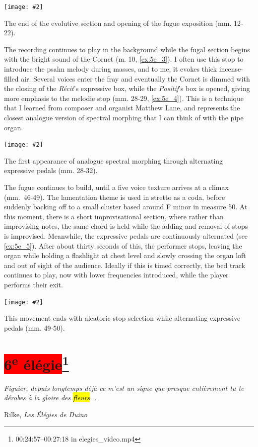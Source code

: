 \documentclass[12pt,twoside,maitrise]{dms_ks}
\newcommand{\customincludeexamples}[4][]{%
    \begin{example}[H]
        \centering
        \texttt{[image: \#2]}
        \caption{#4}
	\label{#3} 
    \end{example}
}
\theoremstyle{definition}
\begin{document}
{\customincludeexamples[width=\textwidth]{5e_3}{ex:5e_3}{The end of the evolutive section and opening of the fugue exposition (mm. 12-22).}

The recording continues to play in the background while the fugal section begins with the bright sound of the Cornet (m. 10, \cref{ex:5e_3}). 
I often use this stop to introduce the psalm melody during masses, and to me, it evokes thick incense-filled air. 
Several voices enter the fray and eventually the Cornet is dimmed with the closing of the \textit{Récit}'s expressive box, while the \textit{Positif}'s box is opened, giving more emphasis to the melodie stop (mm. 28-29, \cref{ex:5e_4}). 
This is a technique that I learned from composer and organist Matthew Lane, and represents the closest analogue version of spectral morphing that I can think of with the pipe organ. 
\customincludeexamples[width=\textwidth]{5e_4}{ex:5e_4}{The first appearance of analogue spectral morphing through alternating expressive pedals (mm. 28-32).}

The fugue continues to build, until a five voice texture arrives at a climax (mm.~46-49). The lamentation theme is used in stretto as a coda, before suddenly backing off to a small cluster based around F minor in measure 50.
At this moment, there is a short improvisational section, where rather than improvising notes, the same chord is held while the adding and removal of stops is improvised.
Meanwhile, the expressive pedals are continuously alternated (see \cref{ex:5e_5}). After about thirty seconds of this, the performer stops, leaving the organ while holding a flashlight at chest level and slowly crossing the organ loft and out of sight of the audience. Ideally if this is timed correctly, the bed track continues to play, now with lower frequencies introduced, while the player performs their exit.

\customincludeexamples[width=\textwidth]{5e_5}{ex:5e_5}{This movement ends with aleatoric stop selection while alternating expressive pedals (mm. 49-50).}

\section{\colorbox{red}{6\textsuperscript{e} élégie}\footnote{00:24:57--00:27:18 in elegies\_video.mp4}}

\epigraph{\textit{Figuier, depuis longtemps déjà ce m'est un signe que presque entièrement tu te dérobes à la gloire des \hl{fleurs}...}}{Rilke, \textit{Les Élégies de Duino}\protect\footnotemark}

}
\end{document}
